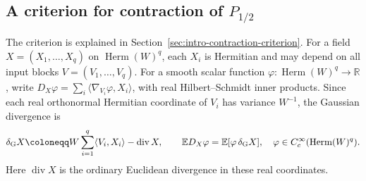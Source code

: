 \documentclass[11pt]{article}
\numberwithin{equation}{section}
\theoremstyle{remark}
\newcommand{\E}{\mathbb E}
\newcommand{\R}{\mathbb R}
\begin{document}
\subsection{A criterion for contraction of \texorpdfstring{$P_{1/2}$}{P(1/2)}}
\label{sec:upper-contraction-rates}
\label{sec:upper-angular}

The criterion is explained in Section~\ref{sec:intro-contraction-criterion}.
For a field
$X=(X_1,\ldots,X_q)$ on $\operatorname{Herm}(W)^q$, each $X_i$ is
Hermitian and may depend on all input blocks $V=(V_1,\ldots,V_q)$.
For a smooth scalar function
$\varphi:\operatorname{Herm}(W)^q\to\R$, write
$D_X\varphi=\sum_i\langle\nabla_{V_i}\varphi,X_i\rangle$, with
real Hilbert--Schmidt inner products. Since each real orthonormal
Hermitian coordinate of $V_i$ has variance $W^{-1}$, the Gaussian
divergence is
\begin{equation}\label{up:eq:gaussian-divergence}
 \delta_{\rm G}X\coloneqq
 W\sum_{i=1}^q\langle V_i,X_i\rangle-\operatorname{div}X,
 \qquad
 \E D_X\varphi=\E[\varphi\,\delta_{\rm G}X],
 \quad\varphi\in C_c^\infty(\operatorname{Herm}(W)^q).
\end{equation}
Here $\operatorname{div}X$ is the ordinary Euclidean divergence in
these real coordinates.
\end{document}

